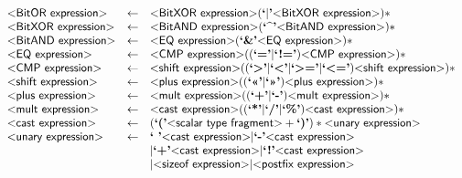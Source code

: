 \begin{figure}
\[\begin{array}{lcl}
  \text{\sf\textless BitOR expression\textgreater} & \gets & \text{\sf\textless BitXOR expression\textgreater} (\text{\bf`$|$'} \text{\sf\textless BitXOR expression\textgreater})*\\

  \text{\sf\textless BitXOR expression\textgreater} & \gets & \text{\sf\textless BitAND expression\textgreater} (\text{\bf`\textasciicircum'} \text{\sf\textless BitAND expression\textgreater})*\\

  \text{\sf\textless BitAND expression\textgreater} & \gets & \text{\sf\textless EQ expression\textgreater} (\text{\bf`\&'} \text{\sf\textless EQ expression\textgreater})*\\

  \text{\sf\textless EQ expression\textgreater} & \gets & \text{\sf\textless CMP expression\textgreater} ((\text{\bf`='}|\text{\bf`!='}) \text{\sf\textless CMP expression\textgreater})*\\

  \text{\sf\textless CMP expression\textgreater} & \gets & \text{\sf\textless shift expression\textgreater} (
               (\text{\bf`\textgreater'}
               |\text{\bf`\textless'}
               |\text{\bf`\textgreater='}
               |\text{\bf`\textless='})
               \text{\sf\textless shift expression\textgreater})*\\

  \text{\sf\textless shift expression\textgreater} & \gets & \text{\sf\textless plus expression\textgreater} (
       (\text{\bf`\textless\textless'}|\text{\bf`\textgreater\textgreater'}) \text{\sf\textless plus expression\textgreater})*\\

  \text{\sf\textless plus expression\textgreater} & \gets & \text{\sf\textless mult expression\textgreater} ((\text{\bf`+'}|\text{\bf`-'}) \text{\sf\textless mult expression\textgreater})*\\

  \text{\sf\textless mult expression\textgreater} & \gets & \text{\sf\textless cast expression\textgreater} ((\text{\bf`*'}|\text{\bf`/'}|\text{\bf`\%'}) \text{\sf\textless cast expression\textgreater})*\\

  \text{\sf\textless cast expression\textgreater} & \gets & (\text{\bf`('} \text{\sf\textless scalar type fragment\textgreater}+ \text{\bf`)'})* \text{\sf\textless unary expression\textgreater}\\

  \text{\sf\textless unary expression\textgreater} & \gets & \text{\bf`~'} \text{\sf\textless cast expression\textgreater}
                              | \text{\bf`-'} \text{\sf\textless cast expression\textgreater}\\&&
                              | \text{\bf`+'} \text{\sf\textless cast expression\textgreater}
                              | \text{\bf`!'} \text{\sf\textless cast expression\textgreater}\\&&
                              | \text{\sf\textless sizeof expression\textgreater}
                              | \text{\sf\textless postfix expression\textgreater}\\


\end{array}\]
\end{figure}
